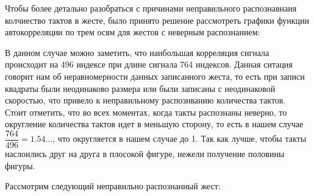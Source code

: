 Чтобы более детально разобраться с причинами неправильного распознавнаия колчиество тактов в жесте, было принято решение рассмотреть графики функции автокорреляции по трем осям для жестов с неверным распознанием:

\begin{figure}[H]
\end{figure}

В данном случае можно заметить, что наибольшая корреляция сигнала происходит на 496 индексе при длине сигнала 764 индексов. Данная ситация говорит нам об неравномерности данных записанного жеста, то есть при записи квадраты были неодинаково размера или были записаны с неодинаковой скоростью, что привело к неправильному распознванию количества тактов. \\

Стоит отметить, что во всех моментах, когда такты распознаны неверно, то округление количества тактов идет в меньшую сторону, то есть в нашем случае $\dfrac{764}{496} = 1.54 \ldots$, что округляется в нашем случае до 1. Так как лучше, чтобы такты наслоились друг на друга в плосокой фигуре, нежели получение половины фигуры.

Рассмотрим следующий неправильно распознанный жест:

\begin{figure}[H]
\end{figure}

